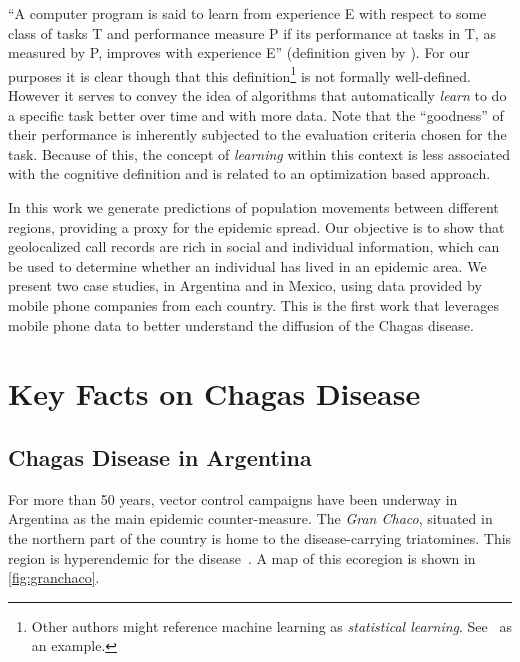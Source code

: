 ``A computer program is said to learn from experience E with respect to some class of tasks T and performance measure P if its performance at tasks in T, as measured by P, improves with experience E'' (definition given by \cite{Mitchell-MLearning}). For our purposes it is clear though that this definition\footnote{Other authors might reference machine learning as \textit{statistical learning}. See~\cite{hastie-elemstatslearn} as an example.} is not formally well-defined. However it serves to convey the idea of algorithms that automatically \textit{learn} to do a specific task better over time and with more data. Note that the ``goodness'' of their performance is inherently subjected to the evaluation criteria chosen for the task. Because of this, the concept of \textit{learning} within this context is less associated with the cognitive definition and is related to an optimization based approach.

 In this work we generate predictions of population movements between different regions, providing a proxy for the epidemic spread. Our objective is to show that geolocalized call records are rich in social and individual information, which can be used to determine whether an individual has lived in an epidemic area. We present two case studies, in Argentina and in Mexico, using data provided by mobile phone companies from each country. %
This is the first work that leverages mobile phone data to better understand the diffusion of the Chagas disease.




\section{Key Facts on Chagas Disease}

\subsection{Chagas Disease in  Argentina}\label{endemic_zone_argentina}

For more than 50 years, vector control campaigns have been underway in Argentina as the main epidemic counter-measure. The \textit{Gran Chaco}, situated in the northern part of the country is home to the disease-carrying triatomines. This region is hyperendemic for the disease~\cite{OPS2014mapa}. A map of this ecoregion is shown in \cref{fig:granchaco}.

